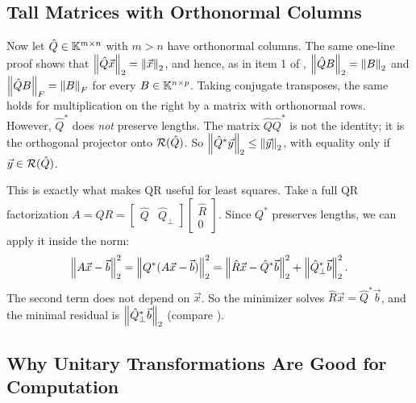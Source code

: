 \subsection{Tall Matrices with Orthonormal Columns}

Now let $\hat{Q} \in \mathbb{K}^{m \times n}$ with $m > n$ have orthonormal columns. The same one-line proof shows that $\left\lVert \hat{Q}\vec{x} \right\rVert_2 = \left\lVert \vec{x} \right\rVert_2$, and hence, as in item 1 of , $\left\lVert \hat{Q}B \right\rVert_2 = \left\lVert B \right\rVert_2$ and $\left\lVert \hat{Q}B \right\rVert_F = \left\lVert B \right\rVert_F$ for every $B \in \mathbb{K}^{n \times p}$. Taking conjugate transposes, the same holds for multiplication on the right by a matrix with orthonormal rows. However, $\hat{Q}^\ast$ does \emph{not} preserve lengths. The matrix $\hat{Q}\hat{Q}^\ast$ is not the identity; it is the orthogonal projector onto $\mathcal{R}(\hat{Q})$. So $\left\lVert \hat{Q}^\ast\vec{y} \right\rVert_2 \le \left\lVert \vec{y} \right\rVert_2$, with equality only if $\vec{y} \in \mathcal{R}(\hat{Q})$.

This is exactly what makes QR useful for least squares. Take a full QR factorization $A = QR = \begin{bmatrix} \hat{Q} & \hat{Q}_\perp \end{bmatrix}\begin{bmatrix} \hat{R} \\ 0 \end{bmatrix}$. Since $Q^\ast$ preserves lengths, we can apply it inside the norm:
\begin{equation}
  \left\lVert A\vec{x} - \vec{b} \right\rVert_2^2 = \left\lVert Q^\ast(A\vec{x} - \vec{b}) \right\rVert_2^2 = \left\lVert \hat{R}\vec{x} - \hat{Q}^\ast\vec{b} \right\rVert_2^2 + \left\lVert \hat{Q}_\perp^\ast\vec{b} \right\rVert_2^2.
\end{equation}
The second term does not depend on $\vec{x}$. So the minimizer solves $\hat{R}\vec{x} = \hat{Q}^\ast\vec{b}$, and the minimal residual is $\left\lVert \hat{Q}_\perp^\ast\vec{b} \right\rVert_2$ (compare ).

\subsection{Why Unitary Transformations Are Good for Computation}

